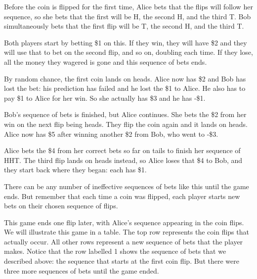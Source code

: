 \documentclass[english,12pt,a4paper,final]{article}
\begin{document}
Before the coin is flipped for the first time, Alice bets that the flips will follow her sequence, so she bets that the first will be H, the second H, and the third T. Bob simultaneously bets that the first flip will be T, the second H, and the third T. 

Both players start by betting \$1 on this. If they win, they will have \$2 and they will use that to bet on the second flip, and so on, doubling each time. If they lose, all the money they wagered is gone and this sequence of bets ends. 

By random chance, the first coin lands on heads. Alice now has \$2 and Bob has lost the bet: his prediction has failed and he lost the \$1 to Alice. He also has to pay \$1 to Alice for her win. So she actually has \$3 and he has -\$1. 

Bob's sequence of bets is finished, but Alice continues. She bets the \$2 from her win on the next flip being heads. They flip the coin again and it lands on heads. Alice  now has \$5 after winning another \$2 from Bob, who went to -\$3. 

Alice bets the \$4 from her correct bets so far on tails to finish her sequence of HHT. The third flip lands on heads instead, so Alice loses that \$4 to Bob, and they start back where they began: each has \$1.

There can be any number of ineffective sequences of bets like this until the game ends. But remember that each time a coin was flipped, each player starts new bets on their chosen sequence of flips.

This game ends one flip later, with Alice's sequence appearing in the coin flips. We will illustrate this game in a table. The top row represents the coin flips that actually occur. All other rows represent a new sequence of bets that the player makes. Notice that the row labelled 1 shows the sequence of bets that we described above: the sequence that starts at the first coin flip. But there were three more sequences of bets until the game ended.
\end{document}
